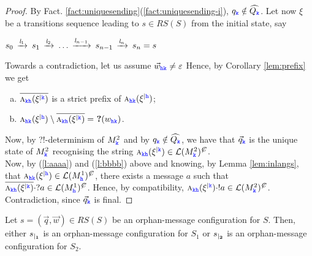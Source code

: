 \begin{proof}
By Fact. \ref{fact:uniquesending}(\ref{fact:uniquesending-i}), 
$q_\KK\notin \widehat{Q_\KK}$.
Let now $\xi$ be a transitions sequence leading to $s\in RS(S)$ from the initial state, say\\
\centerline{
$s_0\lts{\elle_1}s_1\lts{\elle_2} \ldots \lts{\elle_{n-1}}s_{n-1}\lts{\elle_n}s_n=s$
}
Towards a contradiction, let us assume $\vec{w}_{\HH\KK}\neq \varepsilon$ 
Hence, by Corollary \ref{lem:prefix} we get
\begin{enumerate}[a)]
\item 
\label{l:aaaa}
$\Dual{\symb{\KK\HH}{\restrictup{\xi}{\KK}}}$
 is a strict prefix of
$\symb{\HH\KK}{\restrictup{\xi}{\HH}}$;
\item
\label{l:bbbb}
$\symb{\HH\KK}{\restrictup{\xi}{\HH}}\setminus \Dual{\symb{\KK\HH}{\restrictup{\xi}{\KK}}} = \qm({{w}_{\HH\KK}})$.
\end{enumerate}
Now, by ?!-determinism of 
$M^2_\KK$ and by 
$q_\KK\notin \widehat{Q_\KK}$, we have that $\vec{q}_\KK$ is the unique state of $M^2_\KK$ recognising the string 
$\symb{\KK\HH}{\restrictup{\xi}{\KK}}\in \lang{M^2_\KK}^\mC$.\\
Now, by (\ref{l:aaaa}) and (\ref{l:bbbb}) above and knowing, by Lemma \ref{lem:inlangs}, that $\symb{\HH\KK}{\restrictup{\xi}{\HH}}\in\lang{M^1_\HH}^\mC $, 
there exists a message $a$ such that
$\Dual{\symb{\KK\HH}{\restrictup{\xi}{\KK}}}\cdot ?a \in \lang{M^1_\HH}^\mC$.
Hence, by compatibility, $\symb{\KK\HH}{\restrictup{\xi}{\KK}}\cdot !a \in \lang{M^2_\KK}^\mC$.
Contradiction, since $\vec{q}_\KK$ is final.
\end{proof}



\begin{lemma}%
\label{lem:restrRSom}
Let $s= (\vec{q},\vec{w}) \in RS(S)$ be an orphan-message configuration for $S$.
Then,
either $\restrict{s}{1}$ is an  orphan-message configuration for $S_1$
or $\restrict{s}{2}$ is an  orphan-message configuration for $S_2$.
\end{lemma}

